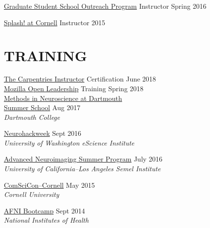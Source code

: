\documentclass{friggeri-bib}
\begin{document}
\vspace{12pt}
\href{https://sites.google.com/site/grasshopratcornell/}{Graduate Student School Outreach Program} Instructor \hfill Spring 2016

\vspace{12pt}
\href{https://cornell.learningu.org/}{Splash! at Cornell} Instructor \hfill 2015

\vspace{10pt}

\section{TRAINING}

\href{https://carpentries.github.io/instructor-training/}{The Carpentries Instructor} Certification \hfill June 2018 \\[0.025cm]

\href{https://mozilla.github.io/leadership-training/}{Mozilla Open Leadership} Training
\hfill Spring 2018 \\[0.025cm]

\href{https://summer-mind.github.io/}{Methods in Neuroscience at Dartmouth \\ Summer School}
\hfill Aug 2017 \\[0.15cm]
\textit{Dartmouth College}
\vspace{10pt}

\href{https://neurohackweek.github.io/}{Neurohackweek}
\hfill Sept 2016 \\[0.15cm]
\textit{University of Washington eScience Institute}
\vspace{10pt}

\href{http://www.brainmapping.org/NITP/Summer2016.php}{Advanced Neuroimaging Summer Program} \hfill July 2016 \\[0.15cm]
\textit{University of California--Los Angeles Semel Institute}
\vspace{10pt}

\href{https://comscicon.com/comscicon-cornell-2015}{ComSciCon--Cornell} \hfill May 2015 \\[0.15cm]
\textit{Cornell University}
\vspace{10pt}

\href{https://afni.nimh.nih.gov/bootcamp/}{AFNI Bootcamp} \hfill Sept 2014 \\[0.15cm]
\textit{National Institutes of Health}
\vspace{10pt}
\end{document}
